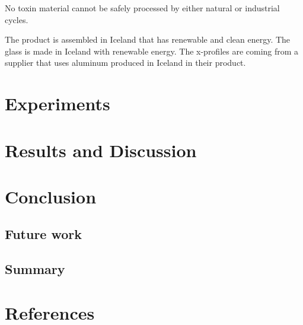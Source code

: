 \documentclass[a4paper]{jpconf}
\begin{document}
No toxin material cannot be safely processed by either natural or industrial cycles.

The product is assembled in Iceland that has renewable and clean energy.
The glass is made in Iceland with renewable energy.
The x-profiles are coming from a supplier that uses aluminum produced in Iceland in their product. 


\section{Experiments}

\section{Results and Discussion}

\section{Conclusion}

\subsection{Future work}

\subsection{Summary}

\section*{References}

\end{document}
